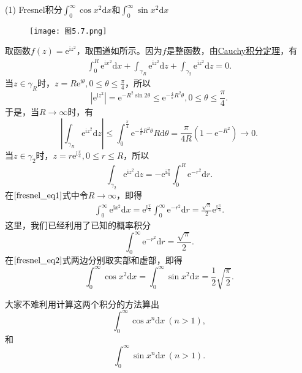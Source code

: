 \documentclass[../../main.tex]{subfiles}
\begin{document}
(1) Fresnel积分\(\int_{0}^{\infty} \cos x^2 \mathrm{d}x\)和\(\int_{0}^{\infty} \sin x^2 \mathrm{d}x\)
\begin{figure}[H]
\centering
\texttt{[image: 图5.7.png]}
\caption{}
\label{figure:图5.7}
\end{figure}
取函数\( f(z) = \mathrm{e}^{\mathrm{i}z^2} \)，取围道如所示。因为\( f \)是整函数，由\hyperref[theorem:Cauchy-Goursat定理(Cauchy积分定理)]{Cauchy积分定理}，有
\begin{align}
\int_{0}^{R} \mathrm{e}^{\mathrm{i}x^2} \mathrm{d}x + \int_{\gamma_R} \mathrm{e}^{\mathrm{i}z^2} \mathrm{d}z + \int_{\gamma_2} \mathrm{e}^{\mathrm{i}z^2} \mathrm{d}z = 0. \label{fresnel_eq1}
\end{align}
当\( z \in \gamma_R \)时，\( z = R\mathrm{e}^{\mathrm{i}\theta}, 0 \leqslant \theta \leqslant \frac{\pi}{4} \)，所以
\[
|\mathrm{e}^{\mathrm{i}z^2}| = \mathrm{e}^{-R^2 \sin 2\theta} \leqslant \mathrm{e}^{-\frac{4}{\pi} R^2 \theta}, 0 \leqslant \theta \leqslant \frac{\pi}{4}.
\]
于是，当\( R \to \infty \)时，有
\[
\left| \int_{\gamma_R} \mathrm{e}^{\mathrm{i}z^2} \mathrm{d}z \right| \leqslant \int_{0}^{\frac{\pi}{4}} \mathrm{e}^{-\frac{4}{\pi} R^2 \theta} R \mathrm{d}\theta
= \frac{\pi}{4R} (1 - \mathrm{e}^{-R^2})
\to 0.
\]
当\( z \in \gamma_2 \)时，\( z = r\mathrm{e}^{\mathrm{i}\frac{\pi}{4}}, 0 \leqslant r \leqslant R \)，所以
\[
\int_{\gamma_2} \mathrm{e}^{\mathrm{i}z^2} \mathrm{d}z = -\mathrm{e}^{\mathrm{i}\frac{\pi}{4}} \int_{0}^{R} \mathrm{e}^{-r^2} \mathrm{d}r.
\]
在\(\eqref{fresnel_eq1}\)式中令\( R \to \infty \)，即得
\begin{align}
\int_{0}^{\infty} \mathrm{e}^{\mathrm{i}x^2} \mathrm{d}x = \mathrm{e}^{\mathrm{i}\frac{\pi}{4}} \int_{0}^{\infty} \mathrm{e}^{-r^2} \mathrm{d}r
= \frac{\sqrt{\pi}}{2} \mathrm{e}^{\mathrm{i}\frac{\pi}{4}}. \label{fresnel_eq2}
\end{align}
这里，我们已经利用了已知的概率积分
\[
\int_{0}^{\infty} \mathrm{e}^{-r^2} \mathrm{d}r = \frac{\sqrt{\pi}}{2}.
\]
在\(\eqref{fresnel_eq2}\)式两边分别取实部和虚部，即得
\[
\int_{0}^{\infty} \cos x^2 \mathrm{d}x = \int_{0}^{\infty} \sin x^2 \mathrm{d}x = \frac{1}{2} \sqrt{\frac{\pi}{2}}.
\]

大家不难利用计算这两个积分的方法算出
\[
\int_{0}^{\infty} \cos x^n \mathrm{d}x \ (n > 1),
\]
和
\[
\int_{0}^{\infty} \sin x^n \mathrm{d}x \ (n > 1).
\]
\end{document}
